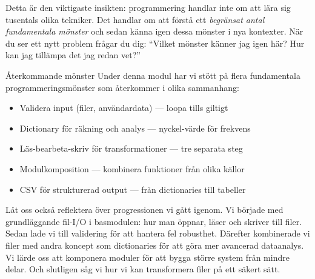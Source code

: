 Detta är den viktigaste insikten: programmering handlar inte om att lära sig tusentals olika tekniker. Det handlar om att förstå ett \emph{begränsat antal fundamentala mönster} och sedan känna igen dessa mönster i nya kontexter. När du ser ett nytt problem frågar du dig: \enquote{Vilket mönster känner jag igen här? Hur kan jag tillämpa det jag redan vet?}

\begin{frame}
  \begin{block}{Återkommande mönster}
    Under denna modul har vi stött på flera fundamentala programmeringsmönster
    som återkommer i olika sammanhang:
    \begin{itemize}
      \item Validera input (filer, användardata) --- loopa tills giltigt
      \item Dictionary för räkning och analys --- nyckel-värde för frekvens
      \item Läs-bearbeta-skriv för transformationer --- tre separata steg
      \item Modulkomposition --- kombinera funktioner från olika källor
      \item CSV för strukturerad output --- från dictionaries till tabeller
    \end{itemize}
  \end{block}
\end{frame}


Låt oss också reflektera över progressionen vi gått igenom. Vi började med grundläggande fil-I/O i basmodulen: hur man öppnar, läser och skriver till filer. Sedan lade vi till validering för att hantera fel robusthet. Därefter kombinerade vi filer med andra koncept som dictionaries för att göra mer avancerad dataanalys. Vi lärde oss att komponera moduler för att bygga större system från mindre delar. Och slutligen såg vi hur vi kan transformera filer på ett säkert sätt.

